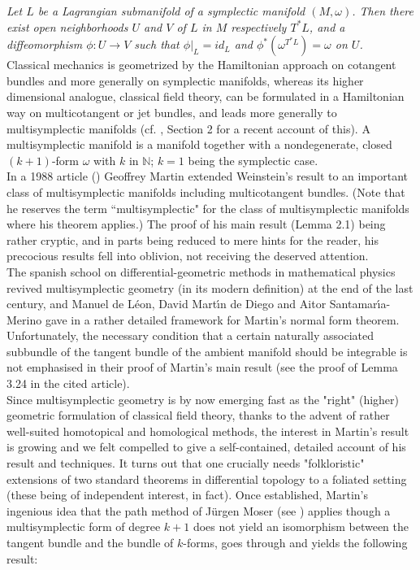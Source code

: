 \documentclass[a4paper,12pt,leqno]{article}
\begin{document}
 {\it Let $L$ be a Lagrangian submanifold of a symplectic manifold $(M,\omega)$. 
Then there exist open neighborhoods 
$U$ and $V$ of $L$ in $M$ respectively $T^*L$, and a diffeomorphism $\phi: U\to V$ such that $\phi\vert_L=id_L$ and
$\phi^*(\omega^{T^*L})=\omega$ on $U$.}\\
  
Classical mechanics is geometrized by the Hamiltonian approach on cotangent bundles and more generally on symplectic manifolds, 
whereas its 
higher dimensional analogue, classical field theory, can be formulated in a Hamiltonian way on multicotangent or jet bundles, and leads more
generally to multisymplectic manifolds (cf. \cite{leotil}, Section 2 for a recent account of this). A multisymplectic manifold is a manifold together with
a nondegenerate, closed $(k{+}1)$-form $\omega$ with $k$ in $\mathbb N$; $k=1$ being the symplectic case.\\

In a 1988  article (\cite{Martin1988}) Geoffrey Martin extended Weinstein's result to an important class of multisymplectic manifolds 
including multicotangent bundles. (Note that he reserves the term ``multisymplectic" for the class of multisymplectic manifolds 
where his theorem 
applies.) The proof of his main result (Lemma 2.1) being rather cryptic, and in parts being reduced to mere hints for the reader, 
his precocious results fell into oblivion, not receiving the deserved attention.\\

The spanish school on differential-geometric methods in mathematical physics revived multisymplectic geometry 
(in its modern definition) at the end of
the last century, and Manuel de L\'eon, David Mart\'\i n de Diego and Aitor Santamar\'\i a-Merino gave in \cite{leodieg} a 
rather detailed framework for 
Martin's normal form theorem. Unfortunately, the necessary condition that a certain naturally associated subbundle of the 
tangent bundle of the ambient
manifold should be integrable is not emphasised in their proof of Martin's main result (see the proof of Lemma 3.24 
in the cited article).\\

Since multisymplectic geometry is by now emerging fast as the "right"  (higher) geometric formulation of classical field theory,
thanks to the advent of rather well-suited homotopical and homological methods, the interest in Martin's result is growing and 
we felt compelled to give a 
self-contained, detailed account of his result and techniques. It turns out that one crucially needs 
"folkloristic" extensions of two 
standard theorems in differential topology to a foliated setting (these being of independent interest, in fact). Once established, 
Martin's ingenious idea that 
the path method of J\"urgen Moser (see \cite{mosvol}) applies though a multisymplectic form of degree $k{+}1$ does not yield an isomorphism between
the tangent bundle and the bundle of $k$-forms, goes through and yields the following result:\\
\end{document}
